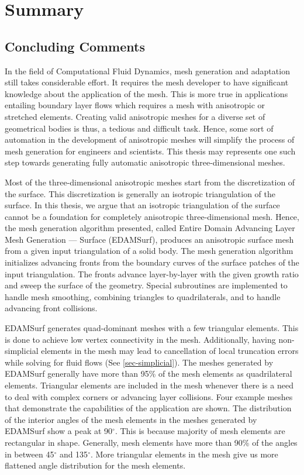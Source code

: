 \chapter{Summary}

\section{Concluding Comments}

In the field of Computational Fluid Dynamics, mesh generation and adaptation still takes considerable effort. It requires the mesh developer to have significant knowledge about the application of the mesh. This is more true in applications entailing boundary layer flows which requires a mesh with anisotropic or stretched elements. Creating valid anisotropic meshes for a diverse set of geometrical bodies is thus, a tedious and difficult task. Hence, some sort of automation in the development of anisotropic meshes will simplify the process of mesh generation for engineers and scientists. This thesis may represents one such step towards generating fully automatic anisotropic three-dimensional meshes.

Most of the three-dimensional anisotropic meshes start from the discretization of the surface. This discretization is generally an isotropic triangulation of the surface. In this thesis, we argue that an isotropic triangulation of the surface cannot be a foundation for completely anisotropic three-dimensional mesh. Hence, the mesh generation algorithm presented, called Entire Domain Advancing Layer Mesh Generation --- Surface (EDAMSurf), produces an anisotropic surface mesh from a given input triangulation of a solid body. The mesh generation algorithm initializes advancing fronts from the boundary curves of the surface patches of the input triangulation. The fronts advance layer-by-layer with the given growth ratio and sweep the surface of the geometry. Special subroutines are implemented to handle mesh smoothing, combining triangles to quadrilaterals, and to handle advancing front collisions.

EDAMSurf generates quad-dominant meshes with a few triangular elements. This is done to achieve low vertex connectivity in the mesh. Additionally, having non-simplicial elements in the mesh may lead to cancellation of local truncation errors while solving for fluid flows (See \ref{sec-simplicial}). The meshes generated by EDAMSurf generally have more than 95\% of the mesh elements as quadrilateral elements. Triangular elements are included in the mesh whenever there is a need to deal with complex corners or advancing layer collisions. Four example meshes that demonstrate the capabilities of the application are shown. The distribution of the interior angles of the mesh elements in the meshes generated by EDAMSurf show a peak at 90$^\circ$. This is because majority of mesh elements are rectangular in shape. Generally, mesh elements have more than 90\% of the angles in between 45$^\circ$ and 135$^\circ$. More triangular elements in the mesh give us more flattened angle distribution for the mesh elements.

